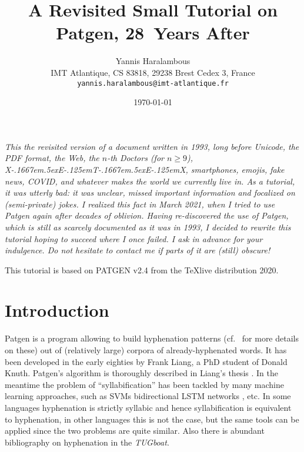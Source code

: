 \documentclass{article}
\title{A Revisited Small Tutorial on Patgen, 28~Years After}
\author{Yannis Haralambous\\\small IMT Atlantique, CS 83818, 29238 Brest Cedex 3, France\\[-2pt]\small\texttt{yannis.haralambous@imt-atlantique.fr}}
\date{\today}
\begin{document}
\maketitle

\def\XeTeX{X\kern-.1667em\lower.5ex\hbox{E}\kern-.125emT\kern-.1667em\lower.5ex\hbox{E}\kern-.125emX}

\emph{This the revisited version of a document written in 1993, long before Unicode, the PDF format, the Web, the $n$-th Doctors (for $n\geq9$), \XeTeX, smartphones, emojis, fake news, COVID, and whatever makes the world we currently live in. As a tutorial, it was utterly \emph{bad}: it was unclear, missed important information and focalized on (semi-private) jokes. I realized this fact in March 2021, when I tried to use Patgen again after decades of oblivion. Having re-discovered the use of Patgen, which is still as scarcely documented as it was in 1993, I decided to rewrite this tutorial hoping to succeed where I once failed. I ask in advance for your indulgence. Do not hesitate to contact me if parts of it are (still) obscure!}

This tutorial is based on PATGEN v2.4 from the \TeX live distribution 2020.

\section{Introduction}

Patgen is a program allowing to build hyphenation patterns (cf.\ \cite[Appendix~H]{DEK-A}  for more details on these) out of (relatively large) corpora of already-hyphenated words. It has been developed in the early eighties by Frank Liang, a PhD student of Donald Knuth. Patgen's algorithm is thoroughly described in Liang's thesis \cite{liang}. In the meantime the problem of ``syllabification'' has been tackled by many machine learning approaches, such as SVMs \cite{bartlett} bidirectional LSTM networks \cite{krantz}, etc. In some languages  hyphenation is strictly syllabic and hence syllabification is equivalent to hyphenation, in other languages this is not the case, but the same tools can be applied since the two problems are quite similar. Also there is abundant bibliography on hyphenation in the \emph{TUGboat}.

\end{document}
